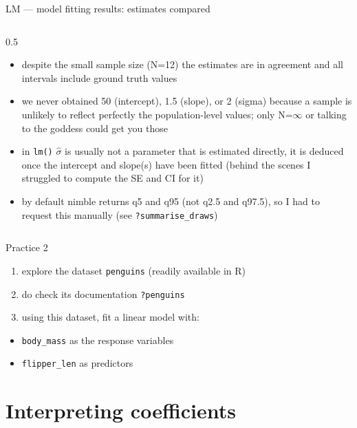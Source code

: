 \documentclass[
  10pt,
  ignorenonframetext,
  aspectratio=169,
  t]{beamer}
\providecommand{\tightlist}{%
  \setlength{\itemsep}{0pt}\setlength{\parskip}{0pt}}
\let\oldtexttt\texttt
\renewcommand{\texttt}[1]{\colorbox{gray!20}{\oldtexttt{#1}}}
\begin{document}
\begin{frame}[fragile]{LM --- model fitting results: estimates compared}
\begin{columns}[T]
\begin{column}{0.5\linewidth}
\begin{footnotesize}
\begin{itemize}
\item<2-> despite the small sample size (N=12) the estimates are in agreement and all intervals include ground truth values
\item<3-> we never obtained 50 (intercept), 1.5 (slope), or 2 (sigma) because a sample is unlikely to reflect perfectly the population-level values; only N=$\infty$ or talking to the goddess could get you those
\end{itemize}
\pause
\vspace{1em}
\begin{itemize}
\item<4-> in \verb`lm()` $\hat{\sigma}$ is usually not a parameter that is estimated directly, it is deduced once the intercept and slope(s) have been fitted (behind the scenes I struggled to compute the SE and CI for it)
\item<5-> by default {nimble} returns q5 and q95 (not q2.5 and q97.5), so I had to request this manually (see \verb`?summarise_draws`)
\end{itemize}
\end{footnotesize}
\end{column}
\end{columns}
\end{frame}

\begin{frame}[fragile]{Practice 2}
\protect{}\label{practice-2}
\begin{enumerate}
\tightlist
\item
  explore the dataset \texttt{penguins} (readily available in R)
\item
  do check its documentation \texttt{?penguins}
\item
  using this dataset, fit a linear model with:
\end{enumerate}

\begin{itemize}
\tightlist
\item
  \texttt{body\_mass} as the response variables
\item
  \texttt{flipper\_len} as predictors
\end{itemize}
\end{frame}

\section{Interpreting coefficients}\label{interpreting-coefficients}
\end{document}
